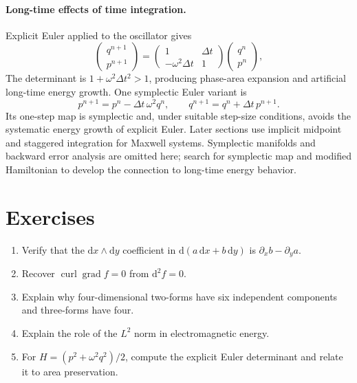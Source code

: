 \documentclass[11pt,openany]{book}
\numberwithin{equation}{chapter}
\theoremstyle{definition}
\theoremstyle{remark}
\newcommand{\dd}{\mathrm d}
\newcommand{\grad}{\operatorname{grad}}
\newcommand{\curl}{\operatorname{curl}}
\begin{document}
\paragraph{Long-time effects of time integration.}
Explicit Euler applied to the oscillator gives
\begin{equation}
\begin{pmatrix}q^{n+1}\\p^{n+1}\end{pmatrix}
=\begin{pmatrix}1&\Delta t\\-\omega^2\Delta t&1\end{pmatrix}
\begin{pmatrix}q^n\\p^n\end{pmatrix},
\end{equation}
The determinant is $1+\omega^2\Delta t^2>1$, producing phase-area expansion and artificial long-time energy growth. One symplectic Euler variant is
\begin{equation}\label{eq:sympeuler}
 p^{n+1}=p^n-\Delta t\,\omega^2q^n,\qquad
 q^{n+1}=q^n+\Delta t\,p^{n+1}.
\end{equation}
Its one-step map is symplectic and, under suitable step-size conditions, avoids the systematic energy growth of explicit Euler. Later sections use implicit midpoint and staggered integration for Maxwell systems. Symplectic manifolds and backward error analysis are omitted here; search for symplectic map and modified Hamiltonian to develop the connection to long-time energy behavior.

\section{Exercises}
\begin{enumerate}
\item Verify that the $\dd x\wedge\dd y$ coefficient in $\dd(a\,\dd x+b\,\dd y)$ is $\partial_xb-\partial_ya$.
\item Recover $\curl\grad f=0$ from $\dd^2f=0$.
\item Explain why four-dimensional two-forms have six independent components and three-forms have four.
\item Explain the role of the $L^2$ norm in electromagnetic energy.
\item For $H=(p^2+\omega^2q^2)/2$, compute the explicit Euler determinant and relate it to area preservation.
\end{enumerate}
\end{document}
